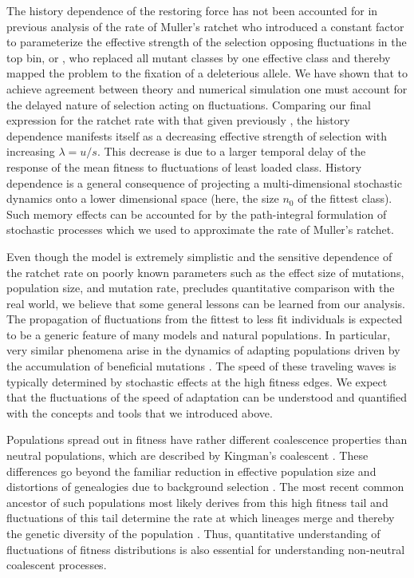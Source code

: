 \documentclass[rmp,preprint]{revtex4}
\newcommand{\n}{n}
\newcommand{\mut}{u}
\begin{document}
The history dependence of the restoring force has not been accounted for in previous analysis of the rate of Muller's ratchet \citep{Haigh:1978p37141,Stephan:1993p42929,Gordo:2000p42688,Jain:2008p45047} who introduced a constant factor to parameterize the effective strength of the selection opposing fluctuations in the top bin, or \citet{Waxman:2010p47020}, who replaced all mutant classes by one effective class and thereby mapped the problem to the fixation of a deleterious allele. We have shown that  to achieve agreement between theory and numerical simulation one must account for the delayed nature of selection acting on fluctuations. Comparing our final expression for the ratchet rate with that given previously \citep{Stephan:1993p42929,Gordo:2000p42688,Jain:2008p45047}, the history dependence manifests itself as a decreasing effective strength of selection with increasing $\lambda =\mut/s$. This decrease is due to a larger temporal delay of the response of the mean fitness to fluctuations of least loaded class. History dependence is a general consequence of projecting a multi-dimensional stochastic dynamics onto a lower dimensional space (here, the size $\n_0$ of the fittest class). Such memory effects can be accounted for by the path-integral formulation of stochastic processes which we used to approximate the rate of Muller's ratchet.

Even though the model is extremely simplistic and the sensitive dependence of the ratchet rate on poorly known parameters such as the effect size of mutations, population size, and mutation rate, precludes quantitative comparison with the real world, we believe that some general lessons can be learned from our analysis. The propagation of fluctuations from the fittest to less fit individuals is expected to be a generic feature of many models and natural populations. 
In particular, very similar phenomena arise in the dynamics of adapting populations driven by the accumulation of beneficial mutations \citep{Tsimring:1996p19688,Rouzine:2003p33590,Rouzine:2008p20864,Cohen:2005p45154,Desai:2007p954,Neher:2010p30641,Hallatschek:2011p39697}. The speed of these traveling waves is typically determined by stochastic effects at the high fitness edges. We expect that the fluctuations of the speed of adaptation can be understood and quantified with the concepts and tools that we introduced above.

Populations spread out in fitness  have rather different coalescence properties than neutral populations, which are described by Kingman's coalescent \citep{Kingman:1982p28911}. These differences go beyond the familiar reduction in effective population size and distortions of genealogies due to background selection \citep{Charlesworth:1993p36005,Higgs:1995p45226,Walczak:2011p45228}. The most recent common ancestor of such populations most likely derives from this high fitness tail and fluctuations of this tail determine the rate at which lineages merge and thereby the genetic diversity of the population \citep{Brunet:2007p18866,Rouzine:2007p17401,Neher:2011p42539}. Thus, quantitative understanding of fluctuations of fitness distributions is also essential for understanding non-neutral coalescent processes.
\end{document}
